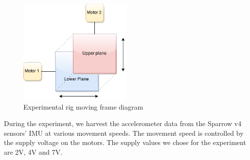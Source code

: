 \begin{figure}[ht] \centering
  \includegraphics[width=0.5\textwidth]{img/experimental-rig.png}
  \caption{Experimental rig moving frame diagram}
\end{figure}

During the experiment, we harvest the accelerometer data from the Sparrow v4 sensors' IMU at various movement speeds.
The movement speed is controlled by the supply voltage on the motors. The supply values we chose for the experiment 
are 2V, 4V and 7V.
